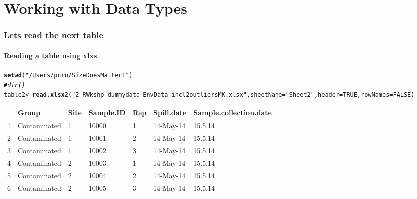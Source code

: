 \documentclass[12pt]{beamer}\usepackage[]{graphicx}\usepackage[]{color}
\makeatletter
\newcommand{\hlnum}[1]{\textcolor[rgb]{0.686,0.059,0.569}{#1}}%
\newcommand{\hlstr}[1]{\textcolor[rgb]{0.192,0.494,0.8}{#1}}%
\newcommand{\hlcom}[1]{\textcolor[rgb]{0.678,0.584,0.686}{\textit{#1}}}%
\newcommand{\hlstd}[1]{\textcolor[rgb]{0.345,0.345,0.345}{#1}}%
\newcommand{\hlkwb}[1]{\textcolor[rgb]{0.69,0.353,0.396}{#1}}%
\newcommand{\hlkwc}[1]{\textcolor[rgb]{0.333,0.667,0.333}{#1}}%
\newcommand{\hlkwd}[1]{\textcolor[rgb]{0.737,0.353,0.396}{\textbf{#1}}}%
\newenvironment{kframe}{%
 \def\at@end@of@kframe{}%
 \ifinner\ifhmode%
  \def\at@end@of@kframe{\end{minipage}}%
  \begin{minipage}{\columnwidth}%
 \fi\fi%
 \def\FrameCommand##1{\hskip\@totalleftmargin \hskip-\fboxsep
 \colorbox{shadecolor}{##1}\hskip-\fboxsep
     \hskip-\linewidth \hskip-\@totalleftmargin \hskip\columnwidth}%
 \MakeFramed {\advance\hsize-\width
   \@totalleftmargin\z@ \linewidth\hsize
   \@setminipage}}%
 {\par\unskip\endMakeFramed%
 \at@end@of@kframe}
\newenvironment{knitrout}{}{} %
\makeatother
\begin{document}
\section*{Working with Data Types}
\begin{frame}[fragile]
  \frametitle{Lets read the next table}
  \framesubtitle{Reading a table using xlxs}
\begin{knitrout}
\color{fgcolor}\begin{kframe}
\begin{alltt}
\hlkwd{setwd}\hlstd{(}\hlstr{"/Users/pcru/SizeDoesMatter1"}\hlstd{)}
\hlcom{#dir()}
\hlstd{table2}\hlkwb{<-}\hlkwd{read.xlsx2}\hlstd{(}\hlstr{"2_R Wkshp_dummy data_Env Data_incl2outliersMK.xlsx"}\hlstd{,} \hlkwc{sheetName} \hlstd{=}\hlstr{"Sheet2"}\hlstd{,}\hlkwc{header}\hlstd{=}\hlnum{TRUE}\hlstd{,}\hlkwc{rowNames}\hlstd{=}\hlnum{FALSE}\hlstd{)}
\end{alltt}
\end{kframe}
\end{knitrout}
\begin{table}[ht]
\centering
\begin{tabular}{rllllll}
  \hline
 & Group & Site & Sample.ID & Rep & Spill.date & Sample.collection.date \\ 
  \hline
1 & Contaminated & 1 & 10000 & 1 & 14-May-14 & 15.5.14 \\ 
  2 & Contaminated & 1 & 10001 & 2 & 14-May-14 & 15.5.14 \\ 
  3 & Contaminated & 1 & 10002 & 3 & 14-May-14 & 15.5.14 \\ 
  4 & Contaminated & 2 & 10003 & 1 & 14-May-14 & 15.5.14 \\ 
  5 & Contaminated & 2 & 10004 & 2 & 14-May-14 & 15.5.14 \\ 
  6 & Contaminated & 2 & 10005 & 3 & 14-May-14 & 15.5.14 \\ 
   \hline
\end{tabular}
\end{table}

\clearpage
\end{frame}
\end{document}
